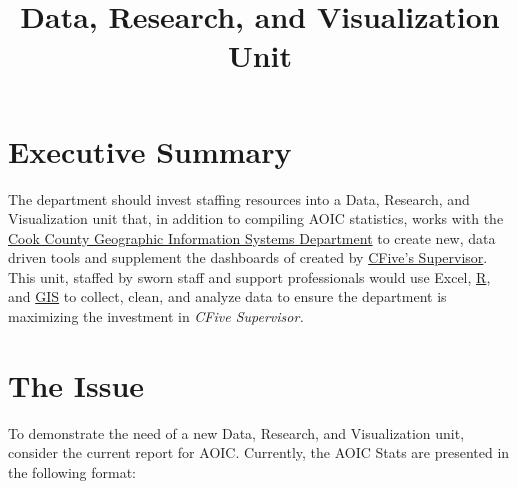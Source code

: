 \documentclass[12pt,]{article}
\title{Data, Research, and Visualization Unit}
\author{}
\date{}
\begin{document}
\maketitle

\hypertarget{executive-summary}{%
\section{Executive Summary}\label{executive-summary}}

The department should invest staffing resources into a Data, Research,
and Visualization unit that, in addition to compiling AOIC statistics,
works with the
\href{https://www.cookcountyil.gov/agency/geographic-information-systems-gis-0}{Cook
County Geographic Information Systems Department} to create new, data
driven tools and supplement the dashboards of created by
\href{https://www.cfive.com/products/supervisor/}{CFive's Supervisor}.
This unit, staffed by sworn staff and support professionals would use
Excel, \href{https://www.r-project.org}{R}, and
\href{https://www.esri.com/en-us/what-is-gis/overview}{GIS} to collect,
clean, and analyze data to ensure the department is maximizing the
investment in \emph{CFive Supervisor.}

\hypertarget{the-issue}{%
\section{The Issue}\label{the-issue}}

To demonstrate the need of a new Data, Research, and Visualization unit,
consider the current report for AOIC. Currently, the AOIC Stats are
presented in the following format:

\begin{table}[!h]

\caption{\label{tab:first_8}First Eight Columns of CFive Supervisor}
\centering
{}
\end{table}
\end{document}
